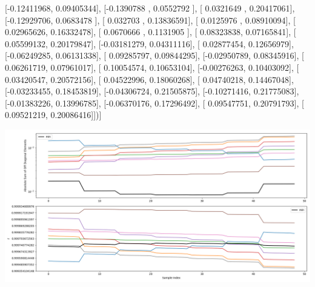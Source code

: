 \documentclass{article}
\begin{document}
       [-0.12411968,  0.09405344],
       [-0.1390788 ,  0.0552792 ],
       [ 0.0321649 ,  0.20417061],
       [-0.12929706,  0.0683478 ],
       [ 0.032703  ,  0.13836591],
       [ 0.0125976 ,  0.08910094],
       [ 0.02965626,  0.16332478],
       [ 0.0670666 ,  0.1131905 ],
       [ 0.08323838,  0.07165841],
       [ 0.05599132,  0.20179847],
       [-0.03181279,  0.04311116],
       [ 0.02877454,  0.12656979],
       [-0.06249285,  0.06131338],
       [ 0.09285797,  0.09844295],
       [-0.02950789,  0.08345916],
       [ 0.06261719,  0.07961017],
       [ 0.10054574,  0.10653104],
       [-0.00276263,  0.10403092],
       [ 0.03420547,  0.20572156],
       [ 0.04522996,  0.18060268],
       [ 0.04740218,  0.14467048],
       [-0.03233455,  0.18453819],
       [-0.04306724,  0.21505875],
       [-0.10271416,  0.21775083],
       [-0.01383226,  0.13996785],
       [-0.06370176,  0.17296492],
       [ 0.09547751,  0.20791793],
       [ 0.09521219,  0.20086416]])]
\begin{center}
\includegraphics[scale=.9]{report_pickled_controls150/control_dpn_all.png}

\end{center}
\end{document}
